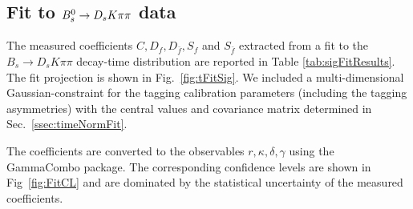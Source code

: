 \subsection{Fit to ${{B}^0_{s}}\rightarrow{\ensuremath{{D}_{s}}}{\ensuremath{K}}{\ensuremath{\pi}}{\ensuremath{\pi}}$ data}
\label{ssec:timeFit}

%
%

The measured \CP coefficients $C,D_{f},D_{\bar{f}},S_{f} $ and $S_{\bar{f}}$ extracted from a 
fit to the $B_s \to D_s K \pi\pi$ decay-time distribution are reported in Table \ref{tab:sigFitResults}.
The fit projection is shown in Fig.~\ref{fig:tFitSig}.
We included a multi-dimensional Gaussian-constraint for the tagging calibration parameters (including the tagging asymmetries) with the central values and covariance matrix determined in Sec.~\ref{ssec:timeNormFit}.

The \CP coefficients are converted to the observables $r,\kappa,\delta,\gamma$ using the GammaCombo package.
The corresponding confidence levels  are shown in Fig~\ref{fig:FitCL} and are dominated by the statistical uncertainty of the measured \CP coefficients.

